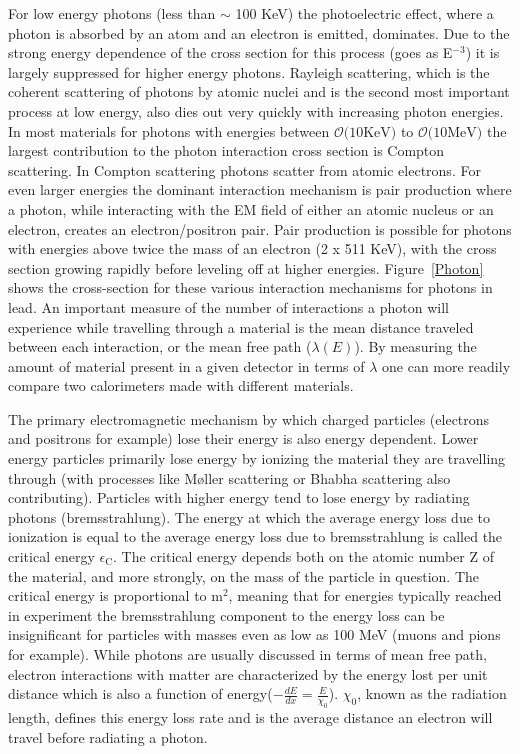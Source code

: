 For low energy photons (less than $\sim$ 100 KeV) the photoelectric effect, where a photon is absorbed by an atom and an electron is emitted, dominates.  
Due to the strong energy dependence of the cross section for this process (goes as E$^{-3}$) it is largely suppressed for higher energy photons.   
Rayleigh scattering, which is the coherent scattering of photons by atomic nuclei and is the second most important process at low energy, also dies out very quickly with increasing photon energies.  
In most materials for photons with energies between $\mathcal{O}\mathrm(10 \mathrm{KeV})$ to $\mathcal{O}\mathrm(10 \mathrm{MeV})$ the largest contribution to the photon interaction cross section is Compton scattering.  
In Compton scattering photons scatter from atomic electrons.  
For even larger energies the dominant interaction mechanism is pair production where a photon, while interacting with the EM field of either an atomic nucleus or an electron, creates an electron/positron pair.  
Pair production is possible for photons with energies above twice the mass of an electron (2 x 511 KeV), with the cross section growing rapidly before leveling off at higher energies.  
Figure~\ref{Photon} shows the cross-section for these various interaction mechanisms for photons in lead.  
An important measure of the number of interactions a photon will experience while travelling through a material is the mean distance traveled between each interaction, or the mean free path ($\lambda\left(E\right)$).  
By measuring the amount of material present in a given detector in terms of $\lambda$ one can more readily compare two calorimeters made with different materials.  


The primary electromagnetic mechanism by which charged particles (electrons and positrons for example) lose their energy is also energy dependent.  
Lower energy particles primarily lose energy by ionizing the material they are travelling through (with processes like M{\o}ller scattering or Bhabha scattering also contributing).  
Particles with higher energy tend to lose energy by radiating photons (bremsstrahlung).  
The energy at which the average energy loss due to ionization is equal to the average energy loss due to bremsstrahlung is called the critical energy $\epsilon_{\mathrm{C}}$.  
The critical energy depends both on the atomic number Z of the material, and more strongly, on the mass of the particle in question.  
The critical energy is proportional to m$^2$, meaning that for energies typically reached in experiment the bremsstrahlung component to the energy loss can be insignificant for particles with masses even as low as 100 MeV (muons and pions for example).  
While photons are usually discussed in terms of mean free path, electron interactions with matter are characterized by the energy lost per unit distance which is also a function of energy($-\frac{dE}{dx}=\frac{E}{\chi_{0}}$).  
$\chi_{0}$, known as the radiation length, defines this energy loss rate and is the average distance an electron will travel before radiating a photon.  

